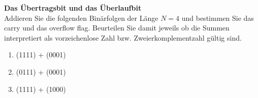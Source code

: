 \textbf{Das Übertragsbit und das Überlaufbit}\\
Addieren Sie die folgenden Binärfolgen der Länge $N=4$ und bestimmen Sie das carry und das overflow flag. Beurteilen Sie damit jeweils ob die Summen interpretiert als vorzeichenlose Zahl bzw. Zweierkomplementzahl gültig sind.
\begin{enumerate}
	\item (1111) + (0001)
	\item (0111) + (0001)
	\item (1111) + (1000)
\end{enumerate}